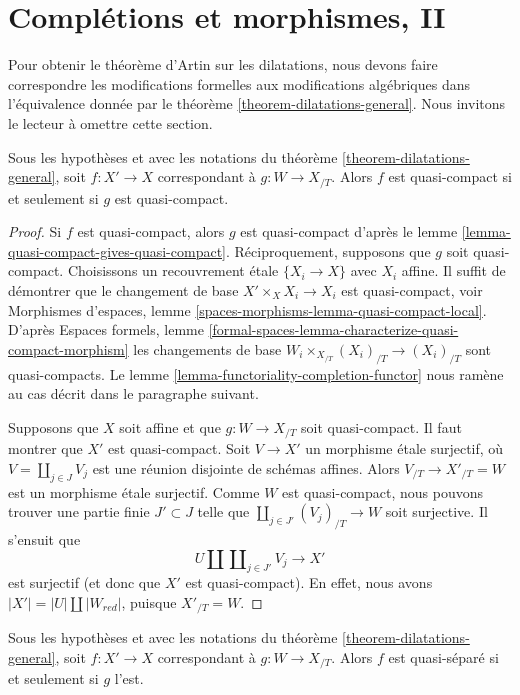 \section{Complétions et morphismes, II}
\label{section-completion-and-morphisms-bis}

\noindent
Pour obtenir le théorème d'Artin sur les dilatations, nous devons faire
correspondre les modifications formelles aux modifications algébriques dans
l'équivalence donnée par le théorème \ref{theorem-dilatations-general}.
Nous invitons le lecteur à omettre cette section.

\begin{lemma}
\label{lemma-output-quasi-compact}
Sous les hypothèses et avec les notations du
théorème \ref{theorem-dilatations-general}, soit $f : X' \to X$
correspondant à $g : W \to X_{/T}$.
Alors $f$ est quasi-compact si et seulement si $g$ est quasi-compact.
\end{lemma}

\begin{proof}
Si $f$ est quasi-compact, alors $g$ est quasi-compact d'après le
lemme \ref{lemma-quasi-compact-gives-quasi-compact}.
Réciproquement, supposons que $g$ soit quasi-compact.
Choisissons un recouvrement étale $\{X_i \to X\}$ avec $X_i$ affine.
Il suffit de démontrer que le changement de base $X' \times_X X_i \to X_i$
est quasi-compact, voir
Morphismes d'espaces, lemme \ref{spaces-morphisms-lemma-quasi-compact-local}.
D'après Espaces formels, lemme
\ref{formal-spaces-lemma-characterize-quasi-compact-morphism}
les changements de base $W_i \times_{X_{/T}} (X_i)_{/T}  \to (X_i)_{/T}$
sont quasi-compacts.
Le lemme \ref{lemma-functoriality-completion-functor}
nous ramène au cas décrit dans le paragraphe suivant.

\medskip\noindent
Supposons que $X$ soit affine et que $g : W \to X_{/T}$ soit quasi-compact.
Il faut montrer que $X'$ est quasi-compact.
Soit $V \to X'$ un morphisme étale surjectif, où
$V = \coprod_{j \in J} V_j$ est une réunion disjointe de schémas affines.
Alors $V_{/T} \to X'_{/T} = W$ est un morphisme étale surjectif.
Comme $W$ est quasi-compact, nous pouvons trouver une partie finie
$J' \subset J$ telle que $\coprod_{j \in J'} (V_j)_{/T} \to W$ soit surjective.
Il s'ensuit que
$$
U \amalg \coprod\nolimits_{j \in J'} V_j \longrightarrow X'
$$
est surjectif (et donc que $X'$ est quasi-compact).
En effet, nous avons $|X'| = |U| \amalg |W_{red}|$, puisque $X'_{/T} = W$.
\end{proof}

\begin{lemma}
\label{lemma-output-quasi-separated}
Sous les hypothèses et avec les notations du
théorème \ref{theorem-dilatations-general}, soit $f : X' \to X$
correspondant à $g : W \to X_{/T}$.
Alors $f$ est quasi-séparé si et seulement si $g$ l'est.
\end{lemma}

